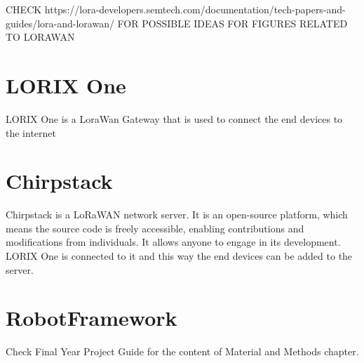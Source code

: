 CHECK https://lora-developers.semtech.com/documentation/tech-papers-and-guides/lora-and-lorawan/ FOR POSSIBLE IDEAS FOR FIGURES RELATED TO LORAWAN
\section{LORIX One}
LORIX One is a LoraWan Gateway that is used to connect the end devices to the internet
\section{Chirpstack}
    Chirpstack is a LoRaWAN network server. It is an open-source platform, which means the source code is freely accessible, enabling contributions and modifications from individuals. It allows anyone to engage in its development. LORIX One is connected to it and this way the end devices can be added to the server.
\section{RobotFramework}



Check Final Year Project Guide for the content of Material and Methods chapter.

\clearpage %
